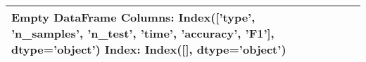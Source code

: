 \begin{tabular}{lllllll}
\toprule
Empty DataFrame
Columns: Index(['type', 'n\_samples', 'n\_test', 'time', 'accuracy', 'F1'], dtype='object')
Index: Index([], dtype='object') \\
\bottomrule
\end{tabular}
